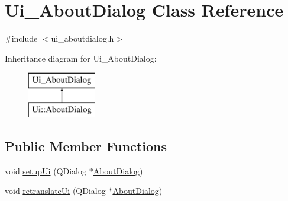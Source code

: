 \hypertarget{class_ui___about_dialog}{}\section{Ui\+\_\+\+About\+Dialog Class Reference}
\label{class_ui___about_dialog}


{\ttfamily \#include $<$ui\+\_\+aboutdialog.\+h$>$}

Inheritance diagram for Ui\+\_\+\+About\+Dialog\+:\begin{figure}[H]
\begin{center}
\leavevmode
\includegraphics[height=2.000000cm]{d3/dfa/class_ui___about_dialog}
\end{center}
\end{figure}
\subsection*{Public Member Functions}
\begin{DoxyCompactItemize}
\item 
void \mbox{\hyperlink{class_ui___about_dialog_a702ca02e273e8027249b3b482e12e4d6}{setup\+Ui}} (Q\+Dialog $\ast$\mbox{\hyperlink{class_about_dialog}{About\+Dialog}})
\item 
void \mbox{\hyperlink{class_ui___about_dialog_a631c82f90dbffd49e4be4f1b4aa2a688}{retranslate\+Ui}} (Q\+Dialog $\ast$\mbox{\hyperlink{class_about_dialog}{About\+Dialog}})
\end{DoxyCompactItemize}
